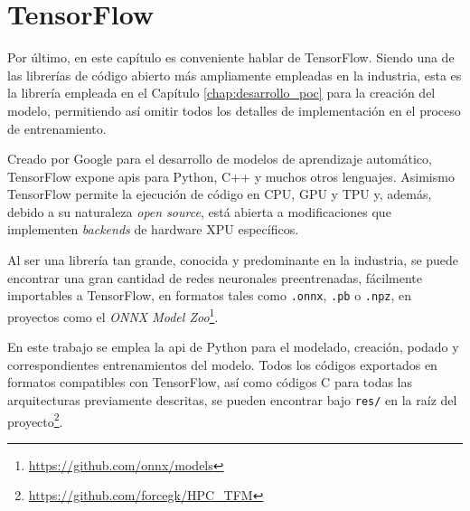 \section{TensorFlow}
\label{sec:tensorflow}
Por último, en este capítulo es conveniente hablar de TensorFlow. Siendo una de las librerías de código abierto más ampliamente empleadas en la industria, esta es la librería empleada en el Capítulo \ref{chap:desarrollo_poc} para la creación del modelo, permitiendo así omitir todos los detalles de implementación en el proceso de entrenamiento.

Creado por Google para el desarrollo de modelos de aprendizaje automático, TensorFlow expone \acrshort{api}s para Python, C++ y muchos otros lenguajes. Asimismo TensorFlow permite la ejecución de código en CPU, GPU y TPU y, además, debido a su naturaleza \textit{open source}, está abierta a modificaciones que implementen \textit{backends} de hardware XPU específicos.

Al ser una librería tan grande, conocida y predominante en la industria, se puede encontrar una gran cantidad de redes neuronales preentrenadas, fácilmente importables a TensorFlow, en formatos tales como \texttt{.onnx}, \texttt{.pb} o \texttt{.npz}, en proyectos como el \textit{ONNX Model Zoo}\footnote{\url{https://github.com/onnx/models}}.

En este trabajo se emplea la \acrshort{api} de Python para el modelado, creación, podado y correspondientes entrenamientos del modelo. Todos los códigos exportados en formatos compatibles con TensorFlow, así como códigos C para todas las arquitecturas previamente descritas, se pueden encontrar bajo \texttt{res/} en la raíz del proyecto\footnote{\url{https://github.com/forcegk/HPC_TFM}}.